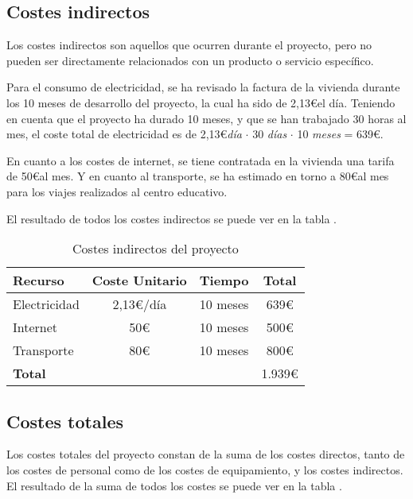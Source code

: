 \subsection{Costes indirectos}\label{subsec:costes_indirectos}
Los costes indirectos son aquellos que ocurren durante el proyecto, pero no pueden ser directamente relacionados con un producto o servicio específico.

Para el consumo de electricidad, se ha revisado la factura de la vivienda durante los 10 meses de desarrollo del proyecto, la cual ha sido de 2,13\euro el día. Teniendo en cuenta que el proyecto ha durado 10 meses, y que se han trabajado 30 horas al mes, el coste total de electricidad es de 2,13\euro \textit{día} $\cdot$ 30 \textit{días} $\cdot$ 10 \textit{meses} = 639\euro. 

En cuanto a los costes de internet, se tiene contratada en la vivienda una tarifa de 50\euro al mes. Y en cuanto al transporte, se ha estimado en torno a 80\euro al mes para los viajes realizados al centro educativo.

El resultado de todos los costes indirectos se puede ver en la tabla .

\begin{table}[htbp]
    \centering
    \caption{Costes indirectos del proyecto}
    \label{tab:costes_indirectos}
    
    \begin{tabular}{@{}lccc@{}}
    \toprule
    Recurso        & Coste Unitario & Tiempo   & \textbf{Total} \\ \midrule
    Electricidad   & 2,13\euro/día      & 10 meses & 639\euro           \\
    Internet       & 50\euro            & 10 meses & 500\euro           \\
    Transporte     & 80\euro            & 10 meses & 800\euro           \\ \midrule
    \textbf{Total} &                &          & 1.939\euro         \\ \bottomrule
    \end{tabular}
    \end{table}

\subsection{Costes totales}\label{subsec:costes_totales}

Los costes totales del proyecto constan de la suma de los costes directos, tanto de los costes de personal como de los costes de equipamiento, y los costes indirectos. El resultado de la suma de todos los costes se puede ver en la tabla .

